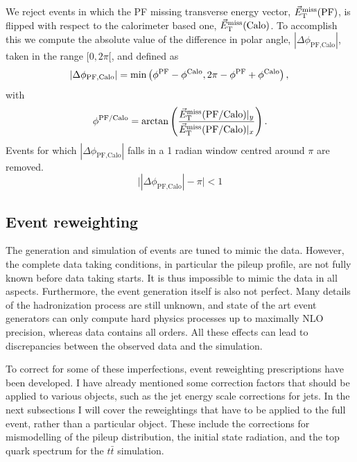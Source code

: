 We reject events in which the PF missing transverse energy vector, ${\vec E}_{\mathrm{T}}^{\text{miss}}(\text{PF})$, is
flipped with respect to the calorimeter based one, ${\vec E}_{\mathrm{T}}^{\text{miss}}(\text{Calo})$. 
To accomplish this we compute the absolute value of the difference in polar angle,
 $|\Delta\phi_{\text{PF,Calo}}|$, taken in the range $[0,2\pi[$, and defined as
\begin{equation}
|\Delta\phi_{\text{PF,Calo}}| = \min \left ( \phi^{\text{PF}} - \phi^{\text{Calo}},   2\pi -
\phi^{\text{PF}} + \phi^{\text{Calo}} \right) ,\\
\end{equation}
with 
\begin{equation}
\phi^{\text{PF/Calo}} = \textrm{arctan} \left( \frac{{\vec E}_{\mathrm{T}}^{\text{miss}}(\text{PF/Calo})|_y}
{{\vec E}_{\mathrm{T}}^{\text{miss}}(\text{PF/Calo})|_x} \right) . \\
\end{equation}
Events for which $|\Delta\phi_{\text{PF,Calo}}|$ falls in a 1 radian window centred around $\pi$
are removed. 
\begin{equation}
\bigl| |\Delta\phi_{\text{PF,Calo}}| - \pi \bigr| < 1
\label{eqn:dphicut}
\end{equation}


\subsection{Event reweighting \label{sec:event_reweighting}}

The generation and simulation of events are tuned to mimic the data. However, the complete data
taking conditions, in particular the pileup profile, are not fully known before data
taking starts. It is thus impossible to mimic the data in all aspects. 
Furthermore, the event generation itself is also not perfect. 
Many details of the hadronization process are still unknown, and state of the art event
generators can only compute hard physics processes up to maximally NLO precision,
whereas data contains all orders.  
All these effects can lead to discrepancies between the observed data and the simulation.  

To correct for some of these imperfections, event reweighting prescriptions have been developed. I
have already mentioned some correction factors that should be applied to various objects, such as
the jet energy scale corrections for jets. 
In the next subsections I will cover the reweightings that have to be applied to the full event,
rather than a particular object. These include the corrections for mismodelling of the pileup
distribution, the initial state radiation, and the top quark \pt spectrum for the
$t\bar{t}$ simulation.


